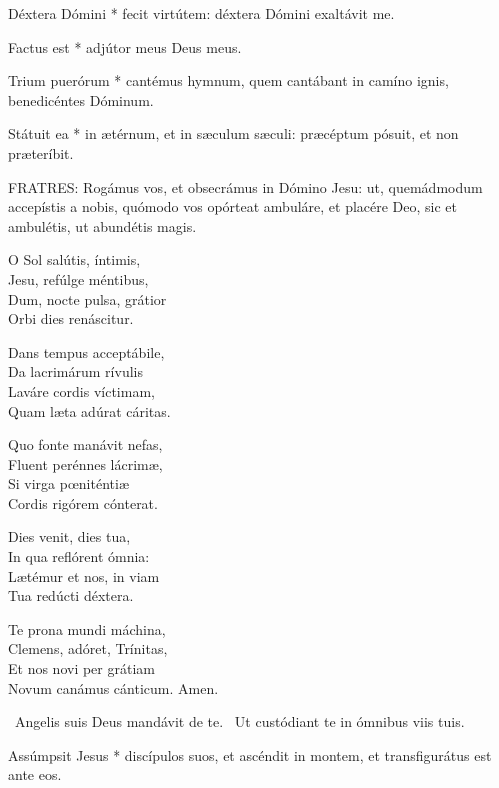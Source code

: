 
 Déxtera Dómini * fecit virtútem: déxtera Dómini exaltávit me.

 Factus est * adjútor meus Deus meus.

 Trium puerórum * cantémus hymnum, quem cantábant in camíno ignis, benedicéntes Dóminum.

 Státuit ea * in ætérnum, et in sæculum sæculi: præcéptum pósuit, et non præteríbit.


\lettrine[lines=2]{F}{RATRES}: Rogámus vos, et obsecrámus in Dómino Jesu: ut, quemádmodum accepístis a nobis, quómodo vos opórteat ambuláre, et placére Deo, sic et ambulétis, ut abundétis magis.


\lettrine[lines=2]{O}{} Sol salútis, íntimis,\\
Jesu, refúlge méntibus,\\
Dum, nocte pulsa, grátior\\
Orbi dies renáscitur.

Dans tempus acceptábile,\\
Da lacrimárum rívulis\\
Laváre cordis víctimam,\\
Quam læta adúrat cáritas.

Quo fonte manávit nefas,\\
Fluent perénnes lácrimæ,\\
Si virga pœniténtiæ\\
Cordis rigórem cónterat.

Dies venit, dies tua,\\
In qua reflórent ómnia:\\
Lætémur et nos, in viam\\
Tua redúcti déxtera.


Te prona mundi máchina,\\
Clemens, adóret, Trínitas,\\
Et nos novi per grátiam\\
Novum canámus cánticum. Amen.

\V\ Angelis suis Deus mandávit de te. \R\ Ut custódiant te in ómnibus viis tuis.

 Assúmpsit Jesus * discípulos suos, et ascéndit in montem, et transfigurátus est ante eos.

